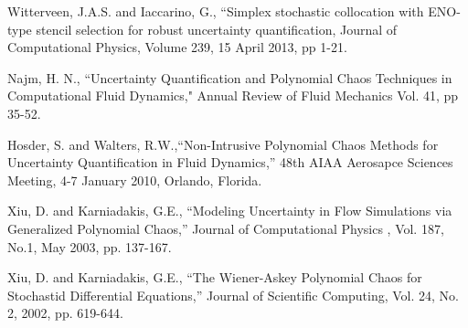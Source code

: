 \documentclass[]{aiaa-tc}%
\begin{document}
\begin{thebibliography}{9}
Witterveen, J.A.S. and Iaccarino, G., ``Simplex stochastic collocation with ENO-type stencil selection for robust uncertainty quantification, Journal of Computational Physics, Volume 239, 15 April 2013, pp 1-21.

Najm, H. N., ``Uncertainty Quantification and Polynomial Chaos Techniques in Computational Fluid Dynamics," Annual Review of Fluid Mechanics
Vol. 41, pp 35-52. 

Hosder, S. and Walters, R.W.,``Non-Intrusive Polynomial Chaos Methods for Uncertainty Quantification in Fluid Dynamics,'' 48th AIAA Aerosapce Sciences Meeting, 4-7 January 2010, Orlando, Florida.

Xiu, D. and Karniadakis, G.E., ``Modeling Uncertainty in Flow Simulations via Generalized Polynomial Chaos,'' Journal of Computational Physics , Vol. 187, No.1, May 2003, pp. 137-167.

Xiu, D. and Karniadakis, G.E., ``The Wiener-Askey Polynomial Chaos for Stochastid Differential Equations,'' Journal of Scientific Computing, Vol. 24, No. 2, 2002, pp. 619-644.

\end{thebibliography}
\end{document}

